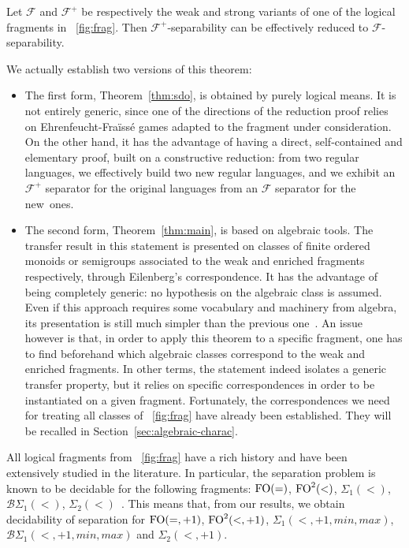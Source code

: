 \documentclass[a4paper,USenglish]{lipics}
\newcommand{\efgame}{Ehrenfeucht-Fra\"iss\'e\xspace}
\newcommand\Fs{\ensuremath{\mathcal{F}}\xspace}
\newcommand{\plus}{\ensuremath{+1,min,max}}
\newcommand{\sio}[1]{\ensuremath{\Sigma_{#1}(<)}\xspace}
\newcommand{\sip}[1]{\ensuremath{\Sigma_{#1}(<,\plus)}\xspace}
\newcommand{\bso}[1]{\ensuremath{\mathcal{B}\Sigma_{#1}(<)}\xspace}
\newcommand{\bsp}[1]{\ensuremath{\mathcal{B}\Sigma_{#1}(<,\plus)}\xspace}
\newcommand{\sdp}{\ensuremath{\Sigma_{2}(<,+1)}\xspace}
\newcommand{\foeq}{\ensuremath{\textup{FO}(=)}\xspace}
\newcommand{\fod}{\ensuremath{\textup{FO}^2(<)}\xspace}
\newcommand{\foeqp}{\ensuremath{\textup{FO}(=,+1)}\xspace}
\newcommand{\fodp}{\ensuremath{\textup{FO}^2(<,+1)}\xspace}
\theoremstyle{plain}
\begin{document}
\begin{theorem} \label{thm:transfer}
  Let \Fs and $\Fs^+$ be respectively the weak and strong variants of
  one of the logical fragments in \figurename~\ref{fig:frag}. Then
  $\Fs^{+}$-separability can be effectively reduced to
  $\Fs$-separability.
\end{theorem}
We actually establish two versions of this theorem:
\begin{itemize}
\item The first form, Theorem~\ref{thm:sdo}, is obtained by purely logical
  means. It is not entirely generic, since one of the directions of the
  reduction proof relies on \efgame games adapted to the fragment under
  consideration. On the other hand, it has the advantage of having a direct,
  self-contained and elementary proof, built on a constructive reduction: from
  two regular languages, we effectively build two new regular languages, and
  we exhibit an $\Fs^+$ separator for the original languages from an $\Fs$
  separator for the new~ones.

\item The second form, Theorem~\ref{thm:main}, is based on algebraic
  tools. The transfer result in this statement is presented on classes of
  finite ordered monoids or semigroups associated to the weak and enriched
  fragments respectively, through Eilenberg's correspondence. It has the
  advantage of being completely generic: no hypothesis on the algebraic class
  is assumed. Even if this approach requires some vocabulary and machinery
  from algebra, its presentation is still much simpler than the previous
  one~\cite{Steinberg:delay-pointlikes:2001}. An issue however is that, in
  order to apply this theorem to a specific fragment, one has to find
  beforehand which algebraic classes correspond to the weak and enriched
  fragments. In other terms, the statement indeed isolates a generic transfer
  property, but it relies on specific correspondences in order to be
  instantiated on a given fragment. Fortunately, the correspondences we need
  for treating all classes of \figurename~\ref{fig:frag} have already been
  established. They will be recalled in Section~\ref{sec:algebraic-charac}.
\end{itemize}

All logical fragments from \figurename~\ref{fig:frag} have a rich history
and have been extensively studied in the literature. In particular, the
separation problem is known to be decidable for the following fragments:
\foeq, \fod, {\sio 1}, {\bso 1}, {\sio
  2}~\cite{sep_icalp13,DBLP:conf/mfcs/PlaceRZ13,PZ:icalp14}. This means that,
from our results, we obtain decidability of separation for \foeqp,
\mbox{\fodp}, {\sip 1}, {\bsp 1} and \sdp.
\end{document}
